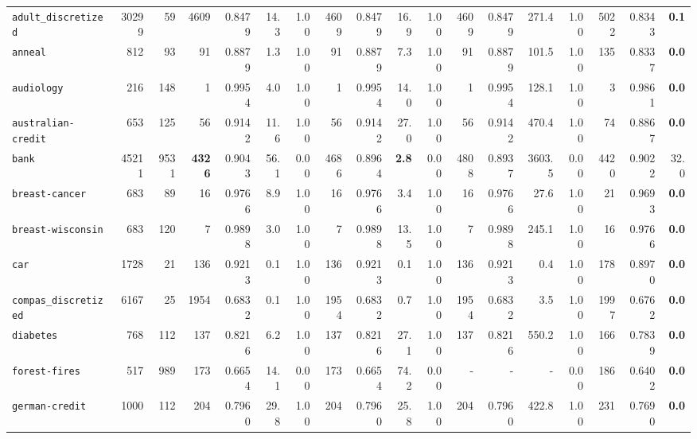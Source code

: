 \begin{tabular}{lccrrrrrrrrrrrrrrr}
\texttt{adult\_discretized} & \multicolumn{1}{r}{30299} & \multicolumn{1}{r}{59}  & 4609 & 0.8479 & 14.3 & 1.00 & 4609 & 0.8479 & 16.9 & 1.00 & 4609 & 0.8479 & 271.4 & 1.00 & 5022 & 0.8343 & \textbf{0.1}\\
\texttt{anneal} & \multicolumn{1}{r}{812} & \multicolumn{1}{r}{93}  & 91 & 0.8879 & 1.3 & 1.00 & 91 & 0.8879 & 7.3 & 1.00 & 91 & 0.8879 & 101.5 & 1.00 & 135 & 0.8337 & \textbf{0.0}\\
\texttt{audiology} & \multicolumn{1}{r}{216} & \multicolumn{1}{r}{148}  & 1 & 0.9954 & 4.0 & 1.00 & 1 & 0.9954 & 14.0 & 1.00 & 1 & 0.9954 & 128.1 & 1.00 & 3 & 0.9861 & \textbf{0.0}\\
\texttt{australian-credit} & \multicolumn{1}{r}{653} & \multicolumn{1}{r}{125}  & 56 & 0.9142 & 11.6 & 1.00 & 56 & 0.9142 & 27.0 & 1.00 & 56 & 0.9142 & 470.4 & 1.00 & 74 & 0.8867 & \textbf{0.0}\\
\texttt{bank} & \multicolumn{1}{r}{45211} & \multicolumn{1}{r}{9531}  & \textbf{4326} & 0.9043 & 56.1 & 0.00 & 4686 & 0.8964 & \textbf{2.8} & 0.00 & 4808 & 0.8937 & 3603.5 & 0.00 & 4420 & 0.9022 & 32.0\\
\texttt{breast-cancer} & \multicolumn{1}{r}{683} & \multicolumn{1}{r}{89}  & 16 & 0.9766 & 8.9 & 1.00 & 16 & 0.9766 & 3.4 & 1.00 & 16 & 0.9766 & 27.6 & 1.00 & 21 & 0.9693 & \textbf{0.0}\\
\texttt{breast-wisconsin} & \multicolumn{1}{r}{683} & \multicolumn{1}{r}{120}  & 7 & 0.9898 & 3.0 & 1.00 & 7 & 0.9898 & 13.5 & 1.00 & 7 & 0.9898 & 245.1 & 1.00 & 16 & 0.9766 & \textbf{0.0}\\
\texttt{car} & \multicolumn{1}{r}{1728} & \multicolumn{1}{r}{21}  & 136 & 0.9213 & 0.1 & 1.00 & 136 & 0.9213 & 0.1 & 1.00 & 136 & 0.9213 & 0.4 & 1.00 & 178 & 0.8970 & \textbf{0.0}\\
\texttt{compas\_discretized} & \multicolumn{1}{r}{6167} & \multicolumn{1}{r}{25}  & 1954 & 0.6832 & 0.1 & 1.00 & 1954 & 0.6832 & 0.7 & 1.00 & 1954 & 0.6832 & 3.5 & 1.00 & 1997 & 0.6762 & \textbf{0.0}\\
\texttt{diabetes} & \multicolumn{1}{r}{768} & \multicolumn{1}{r}{112}  & 137 & 0.8216 & 6.2 & 1.00 & 137 & 0.8216 & 27.1 & 1.00 & 137 & 0.8216 & 550.2 & 1.00 & 166 & 0.7839 & \textbf{0.0}\\
\texttt{forest-fires} & \multicolumn{1}{r}{517} & \multicolumn{1}{r}{989}  & 173 & 0.6654 & 14.1 & 0.00 & 173 & 0.6654 & 74.2 & 0.00 & - & - & - & 0.00 & 186 & 0.6402 & \textbf{0.0}\\
\texttt{german-credit} & \multicolumn{1}{r}{1000} & \multicolumn{1}{r}{112}  & 204 & 0.7960 & 29.8 & 1.00 & 204 & 0.7960 & 25.8 & 1.00 & 204 & 0.7960 & 422.8 & 1.00 & 231 & 0.7690 & \textbf{0.0}\\

\end{tabular}
